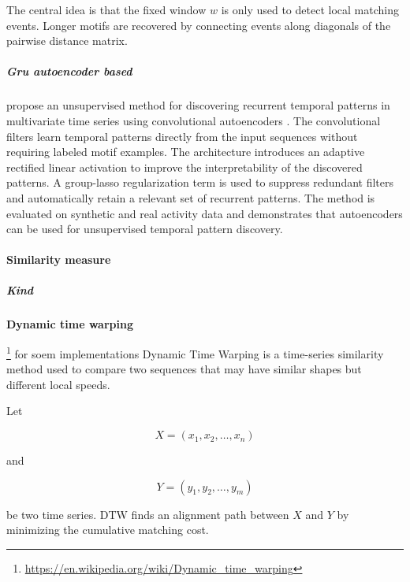 \documentclass{book}
\providecommand{\ProjectDeepHeading}[2]{%
    \par\medskip\noindent\textbf{#2}\par\smallskip
}
\providecommand{\seeherefooter}[1]{\footnote{\url{#1}}}
\begin{document}
      \noindent
      The central idea is that the fixed window \(w\) is only used to detect local matching events. Longer motifs are recovered by connecting events along diagonals of the pairwise distance matrix.

\subparagraph{Gru autoencoder based}


\cite{bascol-2016-unsupervised-interpretable-pattern-discovery-in-time-series-using-autoencoders} propose an unsupervised method for discovering recurrent temporal patterns in multivariate time series using convolutional autoencoders .
   The convolutional filters learn temporal patterns directly from the input sequences without requiring labeled motif examples. The architecture introduces an adaptive rectified linear activation to improve the interpretability of the discovered patterns. A group-lasso regularization term is used to suppress redundant filters and automatically retain a relevant set of recurrent patterns. The method is evaluated on synthetic and real activity data and demonstrates that autoencoders can be used for unsupervised temporal pattern discovery.

\paragraph{Similarity measure}

\subparagraph{Kind}

\ProjectDeepHeading{1}{Dynamic time warping}


\seeherefooter{https://en.wikipedia.org/wiki/Dynamic_time_warping} for soem implementations
   Dynamic Time Warping is a time-series similarity method used to compare two sequences that may have similar shapes but different local speeds.

   Let

   \[
   X
   =
   (
   x_1,
   x_2,
   \ldots,
   x_n
   )
   \]

   and

   \[
   Y
   =
   (
   y_1,
   y_2,
   \ldots,
   y_m
   )
   \]

   be two time series. DTW finds an alignment path between \(X\) and \(Y\) by minimizing the cumulative matching cost.
\end{document}
